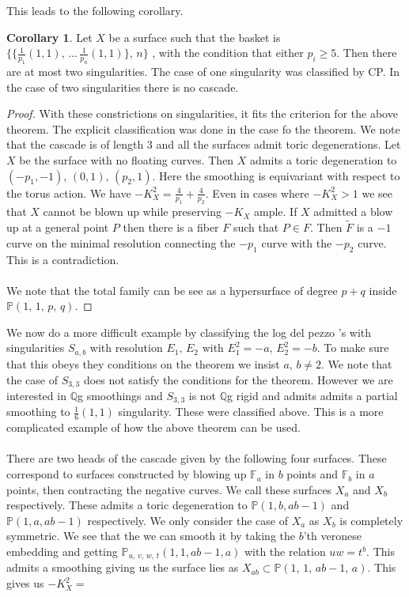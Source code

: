 \documentclass[11pt]{report}
\theoremstyle{definition}
\theoremstyle{definition}
\newtheorem{cor}[thm]{Corollary}
\theoremstyle{definition}
\theoremstyle{definition}
\theoremstyle{definition}
\theoremstyle{definition}
\theoremstyle{definition}
\theoremstyle{definition}
\newcommand{\ldp}{log del pezzo }
\newcommand{\mb}[1]{\mathbb{#1}}
\begin{document}
 This leads to the following corollary.
\begin{cor}
Let $X$ be a surface such that the basket is  $\{ \{ \frac{1}{p_1}(1,1), \, \dots \, \frac{1}{p_n}(1,1) \}, \, n \}$ , with the condition that either $p_i \geq 5$. Then there are at most two singularities. The case of one singularity was classified by CP. In the case of two singularities there is no cascade. 
\end{cor}
\begin{proof}
With these constrictions on singularities, it fits the criterion for the above theorem. The explicit classification was done in the case fo the theorem. We note that the cascade is of length 3 and all the surfaces admit toric degenerations. Let $X$ be the surface with no floating curves. Then $X$ admits a toric degeneration to $(-p_1, -1), \, (0, 1), \, (p_2, 1)$. Here the smoothing is equivariant with respect to the torus action. We have $-K_X^2 = \frac{4}{p_1} + \frac{4}{p_2}$. Even in cases where $-K_X^2 > 1$ we see that $X$ cannot be blown up while preserving $-K_X$ ample. If $X$ admitted a blow up at a general point $P$ then there is a fiber $F$ such that $P \in F$. Then $\widetilde F$ is a $-1$ curve on the minimal resolution connecting the $-p_1$ curve with the $-p_2$ curve. This is a contradiction.
\\
\\
We note that the total family can be see as a hypersurface of degree $p+q$ inside $\mb{P}(1,\,1,\,p,\,q)$.
\end{proof}
We now do a more difficult example by classifying the \ldp's with singularities $S_{a,b}$ with resolution $E_1, \, E_2$ with $E_1^2 = -a,\, E_2^2 = -b$. To make sure that this obeys they conditions on the theorem we insist $a, \, b \neq 2$. We note that the case of $S_{3,3}$ does not satisfy the conditions for the theorem. However we are interested in $\mb{Q}$g smoothings and $S_{3,3}$ is not $\mb{Q}$g rigid and admits admits a partial smoothing to $\frac{1}{6}(1,1)$ singularity. These were classified above. This is a more complicated example of how the above theorem can be used.
\\
\\
There are two heads of the cascade given by the following four surfaces. These correspond to surfaces constructed by blowing up $\mb{F}_a$ in $b$ points and $\mb{F}_b$ in $a$ points, then contracting the negative curves. We call these surfaces $X_a$ and $X_b$ respectively. These admits a toric degeneration to $\mb{P}(1, b, ab-1)$ and $\mb{P}(1, a, ab-1)$ respectively. We only consider the case of $X_a$ as $X_b$ is completely symmetric. We see that the we can smooth it by taking the $b$'th veronese embedding and  getting $\mb{P}_{u,\,v,\,w,\,t}(1, 1, ab-1, a)$ with the relation $uw = t^b$. This admits a smoothing giving us the surface lies as $X_{ab} \subset \mb{P}(1,\, 1, \, ab-1, \, a)$. This gives us $-K_X^2 = $
\end{document}
